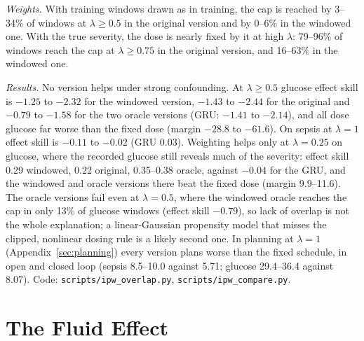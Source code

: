 \documentclass[letterpaper]{article}
\begin{document}
\emph{Weights.} With training windows drawn as in training, the cap is reached by 3--34\% of windows at $\lambda\ge0.5$ in the original version and by 0--6\% in the windowed one. With the true severity, the dose is nearly fixed by it at high $\lambda$: 79--96\% of windows reach the cap at $\lambda\ge0.75$ in the original version, and 16--63\% in the windowed one.

\emph{Results.} No version helps under strong confounding. At $\lambda\ge0.5$ glucose effect skill is $-1.25$ to $-2.32$ for the windowed version, $-1.43$ to $-2.44$ for the original and $-0.79$ to $-1.58$ for the two oracle versions (GRU: $-1.41$ to $-2.14$), and all dose glucose far worse than the fixed dose (margin $-28.8$ to $-61.6$). On sepsis at $\lambda=1$ effect skill is $-0.11$ to $-0.02$ (GRU 0.03). Weighting helps only at $\lambda=0.25$ on glucose, where the recorded glucose still reveals much of the severity: effect skill 0.29 windowed, 0.22 original, 0.35--0.38 oracle, against $-0.04$ for the GRU, and the windowed and oracle versions there beat the fixed dose (margin 9.9--11.6). The oracle versions fail even at $\lambda=0.5$, where the windowed oracle reaches the cap in only 13\% of glucose windows (effect skill $-0.79$), so lack of overlap is not the whole explanation; a linear-Gaussian propensity model that misses the clipped, nonlinear dosing rule is a likely second one. In planning at $\lambda=1$ (Appendix~\ref{sec:planning}) every version plans worse than the fixed schedule, in open and closed loop (sepsis 8.5--10.0 against 5.71; glucose 29.4--36.4 against 8.07). Code: \texttt{scripts/ipw\_overlap.py}, \texttt{scripts/ipw\_compare.py}.

\section{The Fluid Effect}
\label{sec:fluid}
\end{document}
